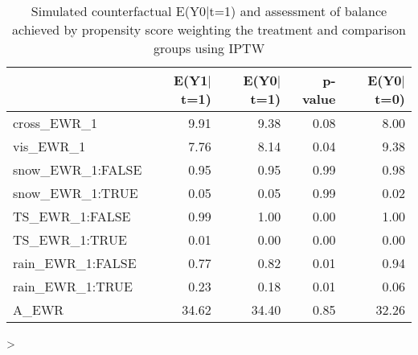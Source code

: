 \documentclass[11pt]{scrartcl}
\begin{document}
\begin{table}[ht]
\centering
\begin{tabular}{lrrrr}
  \hline
 & E(Y1$|$t=1) & E(Y0$|$t=1) & p-value & E(Y0$|$t=0) \\ 
  \hline
cross\_EWR\_1 & 9.91 & 9.38 & 0.08 & 8.00 \\ 
  vis\_EWR\_1 & 7.76 & 8.14 & 0.04 & 9.38 \\ 
  snow\_EWR\_1:FALSE & 0.95 & 0.95 & 0.99 & 0.98 \\ 
  snow\_EWR\_1:TRUE & 0.05 & 0.05 & 0.99 & 0.02 \\ 
  TS\_EWR\_1:FALSE & 0.99 & 1.00 & 0.00 & 1.00 \\ 
  TS\_EWR\_1:TRUE & 0.01 & 0.00 & 0.00 & 0.00 \\ 
  rain\_EWR\_1:FALSE & 0.77 & 0.82 & 0.01 & 0.94 \\ 
  rain\_EWR\_1:TRUE & 0.23 & 0.18 & 0.01 & 0.06 \\ 
  A\_EWR & 34.62 & 34.40 & 0.85 & 32.26 \\ 
   \hline
\end{tabular}
\caption{Simulated counterfactual E(Y0|t=1) and assessment of balance achieved by propensity score weighting the treatment and comparison groups using IPTW} 
\label{tab:balance}
\end{table}
> 





\end{document}
